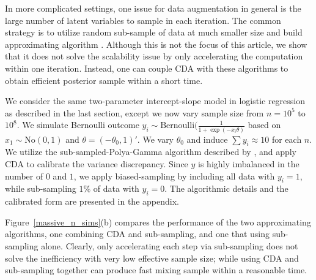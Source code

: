 \documentclass[11pt]{article}
\newcommand{\No}{\text{No}}
\newcommand{\Bern}{\text{Bernoulli}}
\begin{document}
In more complicated settings, one issue for data augmentation in general is the large number of latent variables to sample in each iteration. The common strategy is to utilize random
sub-sample of data at much smaller size and build approximating algorithm  \citep{quiroz2016exact,johndrow2015approximations}. Although this is not
the focus of this article, we show that it does not solve the scalability
issue by only accelerating the computation within one iteration. Instead,
one can couple CDA with these algorithms to obtain efficient posterior sample
within a short time.

We consider the same two-parameter intercept-slope model in logistic regression
as described in the last section, except we now vary sample size from  $n=10^5$ to $10^8$. We simulate Bernoulli outcome $y_i\sim \Bern(\frac{1}{1+\exp(-x_i\theta)}$ based on $x_1\sim \No(0,1)$ and $\theta=(-\theta_0,1)'$. We vary $\theta_0$ and induce $\sum{y_i}\approx
10$ for each $n$. We utilize the sub-sampled-Polya-Gamma algorithm described by \cite{johndrow2015approximations},
and apply CDA to calibrate the variance discrepancy. Since $y$ is highly imbalanced in
the number of $0$ and $1$, we apply biased-sampling by including all data
with $y_i=1$, while
sub-sampling $1\%$  of data with $y_i=0$. The algorithmic details and the calibrated form are presented in the appendix.

Figure~\ref{massive_n_sims}(b) compares the performance of the two approximating
algorithms, one  combining CDA and sub-sampling, and one that using sub-sampling alone. Clearly, only accelerating each step via sub-sampling  does not solve the inefficiency  with very low
effective sample size; while using CDA and  sub-sampling together can produce fast mixing sample
within a reasonable time. 
\end{document}
